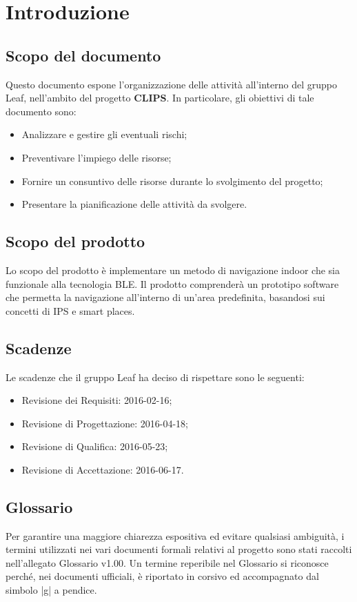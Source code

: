 \documentclass[../PianoProgetto.tex]{subfiles}
\begin{document}
\section{Introduzione}
	\subsection{Scopo del documento}
	Questo documento espone l'organizzazione delle attività all'interno del gruppo Leaf, nell'ambito del progetto \textbf{CLIPS}.
In particolare, gli obiettivi di tale documento sono:
	\begin{itemize}
	\item Analizzare e gestire gli eventuali rischi;
	\item Preventivare l'impiego delle risorse;
	\item Fornire un consuntivo delle risorse durante lo svolgimento del progetto;
	\item Presentare la pianificazione delle attività da svolgere.
	\end{itemize}
	
	\subsection{Scopo del prodotto}
	Lo scopo del prodotto è implementare un metodo di navigazione indoor che sia funzionale alla tecnologia BLE.
	Il prodotto comprenderà un prototipo software che permetta la navigazione all’interno di un’area predefinita, basandosi sui concetti di IPS e smart places.

	\subsection{Scadenze}
		Le scadenze che il gruppo Leaf  ha deciso di rispettare sono le seguenti:
		\begin{itemize}
		\item Revisione dei Requisiti: 2016-02-16;
		\item Revisione di Progettazione: 2016-04-18;
		\item Revisione di Qualifica: 2016-05-23;
		\item Revisione di Accettazione: 2016-06-17.
		\end{itemize}


	\subsection{Glossario}
		Per garantire una maggiore chiarezza espositiva ed evitare qualsiasi ambiguità, i termini utilizzati nei vari documenti formali relativi al progetto sono stati raccolti nell’allegato Glossario v1.00. 
		Un termine reperibile nel Glossario si riconosce perché, nei documenti ufficiali, è riportato in corsivo ed accompagnato dal simbolo |g| a pendice.
\end{document}
